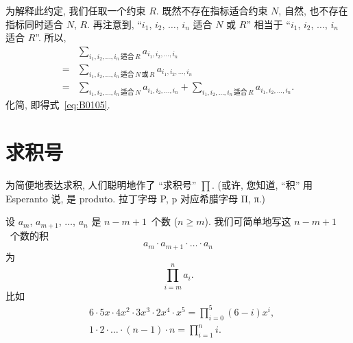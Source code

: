 为解释此约定, 我们任取一个约束 \(R\).
既然不存在指标适合约束 \(N\),
自然, 也不存在指标同时适合 \(N\), \(R\).
再注意到,
``\(i_1\), \(i_2\), \(\dots\), \(i_n\)
适合 \(N\) 或 \(R\)''
相当于
``\(i_1\), \(i_2\), \(\dots\), \(i_n\)
适合 \(R\)''.
所以,
\begin{align*}
         &
    \sum_{i_1,i_2,\dots,i_n\,\text{适合}\,R}
    {a_{i_1, i_2, \dots, i_n}}
    \\
    = {} &
    \sum_{i_1,i_2,\dots,i_n\,\text{适合}\,N\,\text{或}\,R}
    {a_{i_1, i_2, \dots, i_n}}
    \\
    = {} &
    \sum_{i_1,i_2,\dots,i_n\,\text{适合}\,N}
    {a_{i_1, i_2, \dots, i_n}}
    + \sum_{i_1,i_2,\dots,i_n\,\text{适合}\,R}
    {a_{i_1, i_2, \dots, i_n}}.
\end{align*}
化简, 即得式~\eqref{eq:B0105}.

\section{求积号}

为简便地表达求积,
人们聪明地作了 ``求积号'' \(\prod\).
(或许, 您知道, ``积'' 用 Esperanto 说, 是 produto.
拉丁字母 P, p 对应希腊字母 Π, π.)

设 \(a_m\), \(a_{m+1}\), \(\dots\), \(a_n\) 是
\(n - m + 1\)~个数 (\(n \geq m\)).
我们可简单地写这 \(n - m + 1\)~个数的积
\begin{equation}
    a_m \cdot a_{m+1} \cdot \dots \cdot a_n
    \label{eq:B0201}
\end{equation}
为
\begin{equation}
    \prod_{i = m}^{n} {a_i}.
    \label{eq:B0202}
\end{equation}
比如
\begin{align*}
     & 6 \cdot 5x \cdot 4x^2 \cdot 3x^3 \cdot 2x^4 \cdot x^5
    = \prod_{i = 0}^{5} {(6 - i)x^i},                        \\
     & 1 \cdot 2 \cdot \dots \cdot (n - 1) \cdot n
    = \prod_{i = 1}^{n} {i}.
\end{align*}

